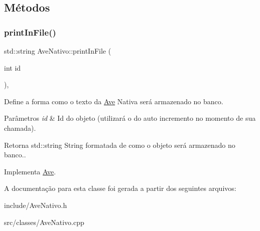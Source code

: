 \subsection{Métodos}
\mbox{\label{classAveNativo_ab95679ed20354b2183706db24899d316}} 
\subsubsection{\texorpdfstring{print\+In\+File()}{printInFile()}}
{\footnotesize\ttfamily std\+::string Ave\+Nativo\+::print\+In\+File (\begin{DoxyParamCaption}\item[{int}]{id }\end{DoxyParamCaption})\hspace{0.3cm}{\ttfamily [protected]}, {\ttfamily [virtual]}}



Define a forma como o texto da \hyperlink{classAve}{Ave} Nativa será armazenado no banco. 


\begin{DoxyParams}{Parâmetros}
{\em id} & Id do objeto (utilizará o do auto incremento no momento de sua chamada). \\
\hline
\end{DoxyParams}
\begin{DoxyReturn}{Retorna}
std\+::string String formatada de como o objeto será armazenado no banco.. 
\end{DoxyReturn}


Implementa \hyperlink{classAve_ab858405e18c56876e331ad943885ee53}{Ave}.



A documentação para esta classe foi gerada a partir dos seguintes arquivos\+:\begin{DoxyCompactItemize}
\item 
include/Ave\+Nativo.\+h\item 
src/classes/Ave\+Nativo.\+cpp\end{DoxyCompactItemize}
